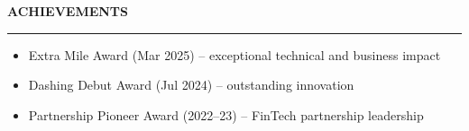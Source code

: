\documentclass[a4paper,11pt]{article}
\newcommand{\cvsection}[1]{%
  \vspace{1pt}
  {\color{dark}\normalsize\bfseries\MakeUppercase{#1}}\par
  \vspace{-5pt}
  {\color{dark}\rule{\linewidth}{1.1pt}}\par
  \vspace{1pt}
}
\begin{document}
\begin{minipage}[t]{0.34\textwidth}
\vspace{3pt}
\cvsection{Achievements}
\begin{itemize}
  \setlength{\baselineskip}{10pt}
  \item Extra Mile Award (Mar 2025) -- exceptional technical and business impact
  \item Dashing Debut Award (Jul 2024) -- outstanding innovation
  \item Partnership Pioneer Award (2022--23) -- FinTech partnership leadership
\end{itemize}

\end{minipage}
\end{document}
